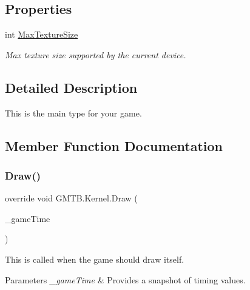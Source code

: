 \subsection*{Properties}
\begin{DoxyCompactItemize}
\item 
int \mbox{\hyperlink{class_g_m_t_b_1_1_kernel_ad813862f6f7e2ba706af02b7b3b42da8}{Max\+Texture\+Size}}
\begin{DoxyCompactList}\small\item\em Max texture size supported by the current device. \end{DoxyCompactList}\end{DoxyCompactItemize}


\subsection{Detailed Description}
This is the main type for your game. 



\subsection{Member Function Documentation}
\mbox{\label{class_g_m_t_b_1_1_kernel_a78938893a17a15dfda040fe7a644a5ec}} 
\subsubsection{\texorpdfstring{Draw()}{Draw()}}
{\footnotesize\ttfamily override void G\+M\+T\+B.\+Kernel.\+Draw (\begin{DoxyParamCaption}\item[{Game\+Time}]{\+\_\+game\+Time }\end{DoxyParamCaption})\hspace{0.3cm}{\ttfamily [protected]}}



This is called when the game should draw itself. 


\begin{DoxyParams}{Parameters}
{\em \+\_\+game\+Time} & Provides a snapshot of timing values.\\
\hline
\end{DoxyParams}
\mbox{\label{class_g_m_t_b_1_1_kernel_a9d856326e2bed95a07e2b61ba9a65c71}} 
